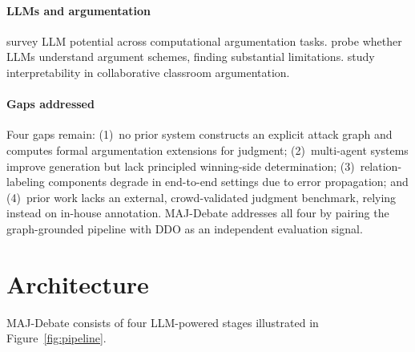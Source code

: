 \documentclass[11pt,twocolumn,letterpaper]{article}
\begin{document}
\paragraph{LLMs and argumentation}
\citet{chen2024exploring} survey LLM potential across computational
argumentation tasks. \citet{bezou2025largellm} probe whether LLMs understand
argument schemes, finding substantial limitations.
\citet{wangchen2024interpretability} study interpretability in collaborative
classroom argumentation.

\paragraph{Gaps addressed}
Four gaps remain: (1)~no prior system constructs an explicit attack graph
and computes formal argumentation extensions for judgment; (2)~multi-agent
systems improve generation but lack principled winning-side determination;
(3)~relation-labeling components degrade in end-to-end settings due to
error propagation; and (4)~prior work lacks an external, crowd-validated
judgment benchmark, relying instead on in-house annotation. MAJ-Debate
addresses all four by pairing the graph-grounded pipeline with DDO as an
independent evaluation signal.

\section{Architecture}

MAJ-Debate consists of four LLM-powered stages illustrated in
Figure~\ref{fig:pipeline}.
\end{document}

